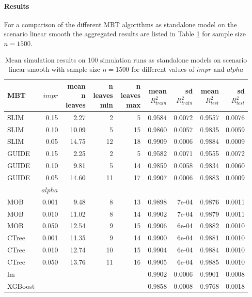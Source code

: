 \paragraph{Results}
For a comparison of the different MBT algorithms as standalone model on the scenario linear smooth the aggregated results are listed in Table \ref{tab:linear_smooth_summary} for sample size $n = 1500$. 

\begin{table}[!htb] 
\centering \tiny
\begin{tabular}[t]{l|r|r|r|r|r|r|r|r}
\hline
MBT & $impr$ & mean n leaves & n leaves min & n leaves max & mean $R^2_{train}$ & sd $R^2_{train}$ & mean $R^2_{test}$ & sd $R^2_{test}$\\
\hline
SLIM & 0.15 & 2.27 & 2 & 5 & 0.9584 & 0.0072 & 0.9557 & 0.0076\\
SLIM & 0.10 & 10.09 & 5 & 15 & 0.9860 & 0.0057 & 0.9835 & 0.0059\\
SLIM & 0.05 & 14.75 & 12 & 18 & 0.9909 & 0.0006 & 0.9884 & 0.0009\\
GUIDE & 0.15 & 2.25 & 2 & 5 & 0.9582 & 0.0071 & 0.9555 & 0.0072\\
GUIDE & 0.10 & 9.81 & 5 & 14 & 0.9859 & 0.0058 & 0.9834 & 0.0060\\
GUIDE & 0.05 & 14.60 & 11 & 17 & 0.9907 & 0.0006 & 0.9883 & 0.0009\\
\hline
 & $alpha$ &  &  &  &  &  &  & \\
\hline
MOB & 0.001 & 9.48 & 8 & 13 & 0.9898 & 7e-04 & 0.9876 & 0.0011\\
MOB & 0.010 & 11.02 & 8 & 14 & 0.9902 & 7e-04 & 0.9879 & 0.0011\\
MOB & 0.050 & 12.54 & 9 & 15 & 0.9906 & 6e-04 & 0.9882 & 0.0010\\
CTree & 0.001 & 11.35 & 9 & 14 & 0.9900 & 6e-04 & 0.9881 & 0.0010\\
CTree & 0.010 & 12.74 & 10 & 15 & 0.9904 & 6e-04 & 0.9884 & 0.0010\\
CTree & 0.050 & 13.76 & 11 & 16 & 0.9905 & 6e-04 & 0.9885 & 0.0010\\
\hline
lm & & & & & 0.9902 & 0.0006 & 0.9901 & 0.0008\\
XGBoost & & & & & 0.9858 & 0.0008 & 0.9768 & 0.0018\\
\hline
\end{tabular}
\caption{Mean simulation results on 100 simulation runs as standalone models on scenario linear smooth with sample size $n = 1500$ for different values of $impr$ and $alpha$}
\label{tab:linear_smooth_summary}
\end{table}


